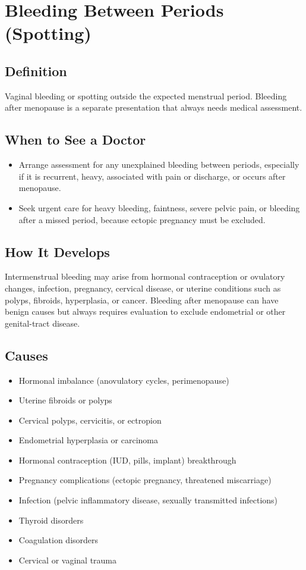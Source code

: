 \chapter{Bleeding Between Periods (Spotting)}

\section*{Definition}
Vaginal bleeding or spotting outside the expected menstrual period. Bleeding after menopause is a separate presentation that always needs medical assessment.

\section*{When to See a Doctor}

\begin{itemize}
 \item Arrange assessment for any unexplained bleeding between periods, especially if it is recurrent, heavy, associated with pain or discharge, or occurs after menopause.
 \item Seek urgent care for heavy bleeding, faintness, severe pelvic pain, or bleeding after a missed period, because ectopic pregnancy must be excluded.
\end{itemize}

\section*{How It Develops}
Intermenstrual bleeding may arise from hormonal contraception or ovulatory changes, infection, pregnancy, cervical disease, or uterine conditions such as polyps, fibroids, hyperplasia, or cancer. Bleeding after menopause can have benign causes but always requires evaluation to exclude endometrial or other genital-tract disease.

\section*{Causes}
\begin{itemize}
 \item Hormonal imbalance (anovulatory cycles, perimenopause)
 \item Uterine fibroids or polyps
 \item Cervical polyps, cervicitis, or ectropion
 \item Endometrial hyperplasia or carcinoma
 \item Hormonal contraception (IUD, pills, implant) breakthrough
 \item Pregnancy complications (ectopic pregnancy, threatened miscarriage)
 \item Infection (pelvic inflammatory disease, sexually transmitted infections)
 \item Thyroid disorders
 \item Coagulation disorders
 \item Cervical or vaginal trauma
\end{itemize}

